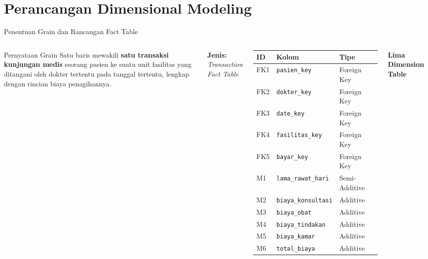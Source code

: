 \documentclass[xcolor=table,t,aspectratio=169]{beamer}
\begin{document}
\section{Perancangan Dimensional Modeling}

\begin{frame}{Penentuan Grain dan Rancangan Fact Table}
  \footnotesize
  \begin{columns}[T]
    \begin{block}{Pernyataan Grain}
      \scriptsize
      Satu baris mewakili \textbf{satu transaksi kunjungan medis} seorang pasien ke suatu unit fasilitas yang ditangani oleh dokter tertentu pada tanggal tertentu, lengkap dengan rincian biaya penagihannya.
    \end{block}

    \vspace{5pt}
    \textbf{Jenis:} \textit{Transaction Fact Table}
    \vspace{4pt}

    \scriptsize
    \begin{tabular}{@{}lll@{}}
      \toprule
      \textbf{ID} & \textbf{Kolom} & \textbf{Tipe} \\
      \midrule
      FK1 & \texttt{pasien\_key}       & Foreign Key \\
      FK2 & \texttt{dokter\_key}       & Foreign Key \\
      FK3 & \texttt{date\_key}         & Foreign Key \\
      FK4 & \texttt{fasilitas\_key}    & Foreign Key \\
      FK5 & \texttt{bayar\_key}        & Foreign Key \\
      M1  & \texttt{lama\_rawat\_hari} & Semi-Additive \\
      M2  & \texttt{biaya\_konsultasi} & Additive \\
      M3  & \texttt{biaya\_obat}       & Additive \\
      M4  & \texttt{biaya\_tindakan}   & Additive \\
      M5  & \texttt{biaya\_kamar}      & Additive \\
      M6  & \texttt{total\_biaya}      & Additive \\
      \bottomrule
    \end{tabular}

    \textbf{Lima Dimension Table}
    \vspace{4pt}


\end{columns}
\end{frame}
\end{document}
